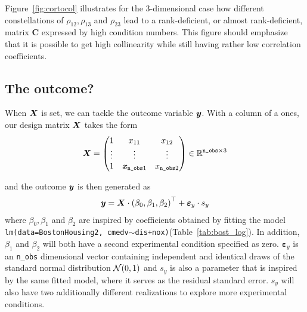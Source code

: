 \documentclass[11pt,a4paper,twoside]{book}\usepackage[]{graphicx}\usepackage[]{xcolor}
\begin{document}
Figure~\ref{fig:cortocol} illustrates for the 3-dimensional case how different constellations of $\rho_{12},\rho_{13}$ and $\rho_{23}$ lead to a rank-deficient, or almost rank-deficient, matrix $\boldsymbol{C}$ expressed by high condition numbers. This figure should emphasize that it is possible to get high collinearity while still having rather low correlation coefficients.

\subsection{The outcome?}

When ${\boldsymbol{X}}$ is set, we can tackle the outcome variable ${\textbf{\textit{y}}}$. With a column of a ones, our design matrix ${\boldsymbol{X}}$ takes the form
\begin{align}
\boldsymbol{X}=
\begin{pmatrix}
  1 & x_{11} & x_{12} \\
  \vdots & \vdots & \vdots \\
  1 & {\textbf{\textit{x}}}_{\texttt{n\_obs}1} & x_{\texttt{n\_obs}2} \\
\end{pmatrix}\in\operatorname{\mathbb{R}}^{\texttt{n\_obs}\times 3}\label{eq:desma}
\end{align}

and the outcome ${\textbf{\textit{y}}}$ is then generated as
\begin{align*}
{\textbf{\textit{y}}}={\boldsymbol{X}}\cdot \left(\beta_0,\beta_1,\beta_2\right)^\top
+ \boldsymbol{\varepsilon}_y\cdot s_y
\end{align*}
where $\beta_0, \beta_1$ and $\beta_2$ are inspired by coefficients obtained by fitting the model \\\texttt{lm(data=BostonHousing2, cmedv$\sim$dis+nox)}(Table~\ref{tab:bost_log}). In addition, $\beta_1$ and $\beta_2$ will both have a second experimental condition specified as zero. $\boldsymbol{\varepsilon}_y$ is an \texttt{n\_obs} dimensional vector containing independent and identical draws of the standard normal distribution $\operatorname{\mathcal{N}}(0,1)$ and $s_y$ is also a parameter that is inspired by the same fitted model, where it serves as the residual standard error. $s_y$ will also have two additionally different realizations to explore more experimental conditions.
\end{document}
